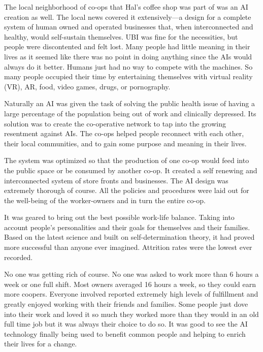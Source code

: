 \subsectsep

The local neighborhood of co-ops that Hal's coffee shop was part
of was an AI creation as well. The local news covered it
extensively---a design for a complete system of human owned and
operated businesses that, when interconnected and healthy, would
self-sustain themselves.  UBI was fine for the necessities,
but people were discontented and felt lost. Many people had
little meaning in their lives as it seemed like there was no
point in doing anything since the AIs would always do it better.
Humans just had no way to compete with the machines.  So many
people occupied their time by entertaining themselves with
virtual reality (VR), AR, food, video games, drugs, or
pornography.

Naturally an AI was given the task of solving the public health
issue of having a large percentage of the population being out
of work and clinically depressed.  Its solution was to create
the co-operative network to tap into the growing resentment
against AIs.  The co-ops helped people reconnect with each other,
their local communities, and to gain some purpose and meaning
in their lives.

The system was optimized so that the production of one co-op
would feed into the public space or be consumed by another
co-op. It created a self renewing and interconnected system of
store fronts and businesses. The AI design was
extremely thorough of course. All the policies and procedures
were laid out for the well-being of the worker-owners and in turn
the entire co-op.

It was geared to bring out the best possible work-life balance.
Taking into account people's personalities and their goals for
themselves and their families. Based on the latest science and
built on self-determination theory, it had proved more
successful than anyone ever imagined.  Attrition rates were the
lowest ever recorded.

No one was getting rich of course. No one was asked to work
more than 6 hours a week or one full shift. Most owners averaged
16 hours a week, so they could earn more coopers.  Everyone
involved reported extremely high levels of fulfillment and
greatly enjoyed working with their friends and families. Some
people just dove into their work and loved it so much they
worked more than they would in an old full time job but it was
always their choice to do so. It was good to see the AI
technology finally being used to benefit common people and
helping to enrich their lives for a change.



